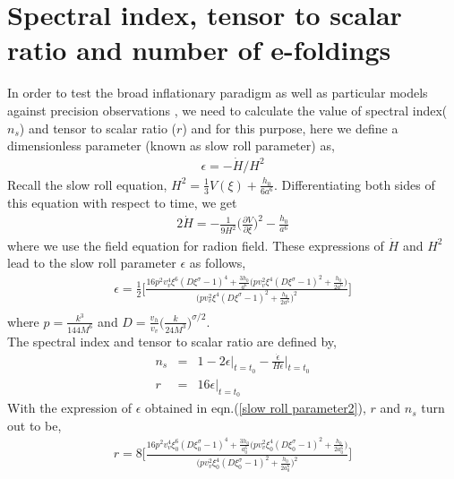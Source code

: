 \documentclass[a4paper]{article}
\begin{document}
\section{Spectral index, tensor to scalar ratio and number of e-foldings}
In order to test the broad inflationary paradigm as well as particular models 
against precision observations \cite{Planck}, we need to calculate the value of spectral index($n_s$) and tensor to scalar ratio ($r$) and 
for this purpose, here we define a dimensionless parameter (known as slow roll parameter) as,
\begin{eqnarray}
 \epsilon = -\dot{H}/H^2
 \label{slow roll parameter1}
\end{eqnarray}
Recall the slow roll equation, $H^2 = \frac{1}{3}V(\xi) + \frac{h_0}{6a^6}$. Differentiating both sides of this equation with respect to time, we 
get
\begin{eqnarray}
 2\dot{H} = -\frac{1}{9H^2}\bigg(\frac{\partial V}{\partial\xi}\bigg)^2 - \frac{h_0}{a^6}
 \nonumber
\end{eqnarray}
where we use the field equation for radion field. These expressions of $\dot{H}$ and $H^2$ lead to the slow roll parameter $\epsilon$ as follows,
\begin{eqnarray}
 \epsilon = \frac{1}{2}\bigg[\frac{16p^2v_v^4\xi^6(D\xi^{\sigma}-1)^4 + \frac{3h_0}{a^6}\bigg(pv_v^2\xi^4(D\xi^{\sigma}-1)^2+\frac{h_0}{2a^6}\bigg)}
 {\bigg(pv_v^2\xi^4(D\xi^{\sigma}-1)^2 + \frac{h_0}{2a^6}\bigg)^2}\bigg]\nonumber\\
 \label{slow roll parameter2}
\end{eqnarray}
where $p = \frac{k^3}{144M^6}$ and $D = \frac{v_h}{v_v}\big(\frac{k}{24M^3}\big)^{\sigma/2}$.\\
The spectral index  and tensor to scalar ratio are defined by,
\begin{eqnarray}
 n_s&=&1 - 2\epsilon\bigg|_{t=t_0} - \frac{\dot{\epsilon}}{H\epsilon}\bigg|_{t=t_0}\nonumber\\
 r&=&16\epsilon\bigg|_{t=t_0}
 \nonumber
\end{eqnarray}
With the expression of $\epsilon$ obtained in eqn.(\ref{slow roll parameter2}), $r$ and $n_s$ turn out to be,
\begin{eqnarray}
 r = 8\bigg[\frac{16p^2v_v^4\xi_0^6(D\xi_0^{\sigma}-1)^4 + \frac{3h_0}{a_0^6}\bigg(pv_v^2\xi_0^4(D\xi_0^{\sigma}-1)^2+\frac{h_0}{2a_0^6}\bigg)}
 {\bigg(pv_v^2\xi_0^4(D\xi_0^{\sigma}-1)^2 + \frac{h_0}{2a_0^6}\bigg)^2}\bigg]\nonumber\\
 \label{ratio}
\end{eqnarray}
\end{document}
